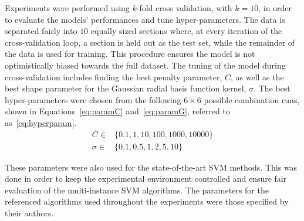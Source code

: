 Experiments were performed using $k$-fold cross validation, with $k = 10$, in order to evaluate the models' performances and tune hyper-parameters. The data is separated fairly into $10$ equally sized sections where, at every iteration of the cross-validation loop, a section is held out as the test set, while the remainder of the data is used for training. This procedure ensures the model is not optimistically biased towards the full dataset. The tuning of the model during cross-validation includes finding the best penalty parameter, $C$, as well as the best shape parameter for the Gaussian radial basis function kernel, $\sigma$. The best hyper-parameters were chosen from the following $6 \times 6$ possible combination runs, shown in Equations~\eqref{eq:paramC} and~\eqref{eq:paramG}, referred to as~\eqref{eq:hyperparam}. 
\begin{subequations}
\label{eq:hyperparam}
\begin{align}
C \in  & \{0.1, 1, 10, 100, 1000, 10000\} \label{eq:paramC}\\
\sigma \in  & \{0.1, 0.5, 1, 2, 5, 10\} \label{eq:paramG}
\end{align}
\end{subequations}

These parameters were also used for the state-of-the-art SVM methods. This was done in order to keep the experimental environment controlled and ensure fair evaluation of the multi-instance SVM algorithms. The parameters for the referenced algorithms used throughout the experiments were those specified by their authors.

